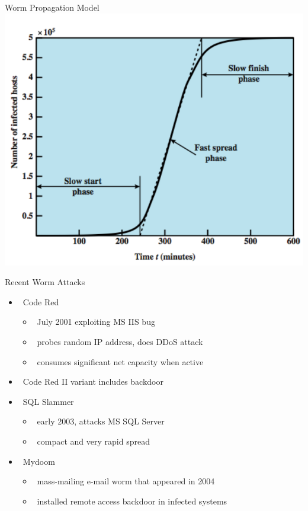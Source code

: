 \documentclass{beamer}
\begin{document}
\begin{frame}{Worm Propagation Model}
\includegraphics[width=0.8\linewidth]{wormPropagation}
\end{frame}


\begin{frame}{Recent Worm Attacks}
  \begin{itemize}
  \item  Code Red 
    \begin{itemize}
    \item  July 2001 exploiting MS IIS bug 
    \item  probes random IP address, does DDoS attack 
    \item  consumes significant net capacity when active 
    \end{itemize}
  \item  Code Red II variant includes backdoor 
  \item  SQL Slammer 
    \begin{itemize}
    \item  early 2003, attacks MS SQL Server 
    \item  compact and very rapid spread 
    \end{itemize}
  \item  Mydoom 
    \begin{itemize}
    \item  mass-mailing e-mail worm that appeared in 2004 
    \item  installed remote access backdoor in infected systems 
    \end{itemize}
  \end{itemize}
\end{frame}
\end{document}
